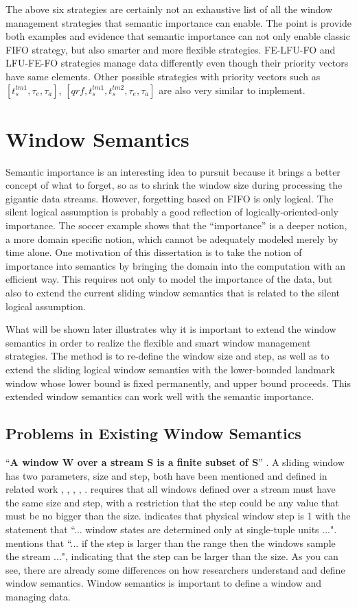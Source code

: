 The above six strategies are certainly not an exhaustive list of all the window management strategies that semantic importance can enable. 
The point is provide both examples and evidence that semantic importance can not only enable classic FIFO strategy, but also smarter and more flexible strategies. 
FE-LFU-FO and LFU-FE-FO strategies manage data differently even though their priority vectors have same elements. 
Other possible strategies with priority vectors such as $[t^{tm1}_{s}, \tau_{e}, \tau_{a}]$, $[qrf, t^{tm1}_{s}, t^{tm2}_{s}, \tau_{e}, \tau_{a}]$ are also very similar to implement.
%
\section{Window Semantics}
Semantic importance is an interesting idea to pursuit because it brings a better concept of what to forget, so as to shrink the window size during processing the gigantic data streams.
However, forgetting based on FIFO is only logical.
The silent logical assumption is probably a good reflection of logically-oriented-only importance.
The soccer example shows that the ``importance'' is a deeper notion, a more domain specific notion, which cannot be adequately modeled merely by time alone. 
One motivation of this dissertation is to take the notion of importance into semantics by bringing the domain into the computation with an efficient way. 
This requires not only to model the importance of the data, but also to extend the current sliding window semantics that is related to the silent logical assumption. 

What will be shown later illustrates why it is important to extend the window semantics in order to realize the flexible and smart window management strategies.
The method is to re-define the window size and step, as well as to extend the sliding logical window semantics with the lower-bounded landmark window whose lower bound is fixed permanently, and upper bound proceeds. 
This extended window semantics can work well with the semantic importance. 
%
\subsection{Problems in Existing Window Semantics}
``\textbf{A window W over a stream S is a finite subset of S}'' \cite{dindar2013modeling}.
A sliding window has two parameters, size and step, both have been mentioned and defined in related work \cite{beck2015lars}, \cite{dindar2013modeling}, \cite{prud2008sparql}, \cite{botan2010secret}, \cite{arasu2006cql}.
\cite{dindar2013modeling} requires that all windows defined over a stream must have the same size and step, with a restriction that the step could be any value that must be no bigger than the size.
\cite{patroumpas2006window} indicates that physical window step is 1 with the statement that ``... window states are determined only at single-tuple units ...". 
\cite{calbimonte2010enabling} mentions that ``... if the step is larger than the range then the windows sample the stream ...", indicating that the step can be larger than the size. 
As you can see, there are already some differences on how researchers understand and define window semantics. 
Window semantics is important to define a window and managing data.

